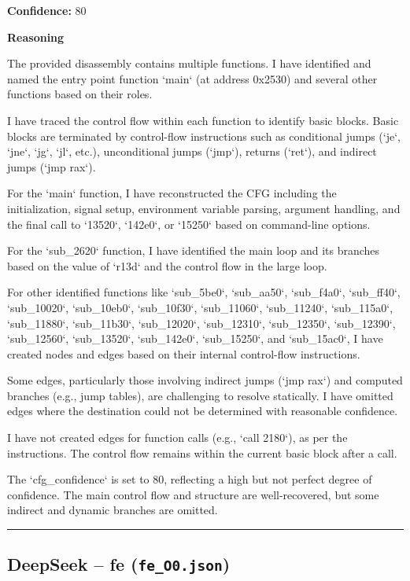 \textbf{Confidence:} 80

\textbf{Reasoning}

The provided disassembly contains multiple functions. I have identified and named the entry point function `main` (at address 0x2530) and several other functions based on their roles.

I have traced the control flow within each function to identify basic blocks. Basic blocks are terminated by control-flow instructions such as conditional jumps (`je`, `jne`, `jg`, `jl`, etc.), unconditional jumps (`jmp`), returns (`ret`), and indirect jumps (`jmp rax`).

For the `main` function, I have reconstructed the CFG including the initialization, signal setup, environment variable parsing, argument handling, and the final call to `13520`, `142e0`, or `15250` based on command-line options.

For the `sub\_2620` function, I have identified the main loop and its branches based on the value of `r13d` and the control flow in the large loop.

For other identified functions like `sub\_5be0`, `sub\_aa50`, `sub\_f4a0`, `sub\_ff40`, `sub\_10020`, `sub\_10eb0`, `sub\_10f30`, `sub\_11060`, `sub\_11240`, `sub\_115a0`, `sub\_11880`, `sub\_11b30`, `sub\_12020`, `sub\_12310`, `sub\_12350`, `sub\_12390`, `sub\_12560`, `sub\_13520`, `sub\_142e0`, `sub\_15250`, and `sub\_15ac0`, I have created nodes and edges based on their internal control-flow instructions.

Some edges, particularly those involving indirect jumps (`jmp rax`) and computed branches (e.g., jump tables), are challenging to resolve statically. I have omitted edges where the destination could not be determined with reasonable confidence.

I have not created edges for function calls (e.g., `call 2180`), as per the instructions. The control flow remains within the current basic block after a call.

The `cfg\_confidence` is set to 80, reflecting a high but not perfect degree of confidence. The main control flow and structure are well-recovered, but some indirect and dynamic branches are omitted.

\bigskip
\hrule
\bigskip

\subsection{DeepSeek -- fe (\texttt{fe\_O0.json})}

